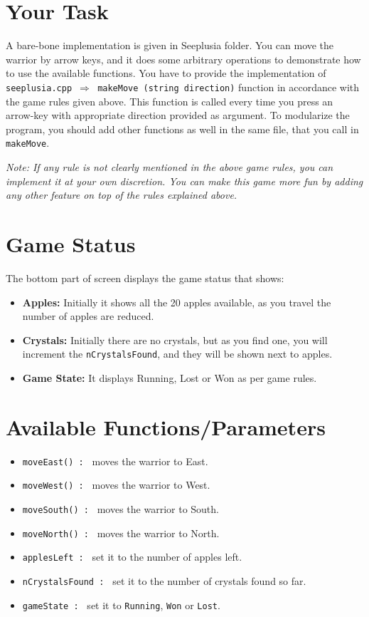 \documentclass[a4paper,12pt]{article}
\begin{document}
\section{Your Task}
A bare-bone implementation is given in Seeplusia folder. You can move the warrior by arrow keys, and it does some arbitrary operations to demonstrate how to use the available functions. You have to provide the implementation of \texttt{seeplusia.cpp $\Rightarrow$ makeMove (string direction)} function in accordance with the game rules given above. This function is called every time you press an arrow-key with appropriate direction provided as argument. To modularize the program, you should add other functions as well in the same file, that you call in \texttt{makeMove}.

\textit{ Note: If any rule is not clearly mentioned in the above game rules, you can implement it at your own discretion. You can make this game more fun by adding any other feature on top of the rules explained above. }

\section{Game Status}
The bottom part of screen displays the game status that shows:

\begin{itemize}
	\item \textbf{Apples: } Initially it shows all the 20 apples available, as you travel the number of apples are reduced.
	\item \textbf{Crystals: } Initially there are no crystals, but as you find one, you will increment the \texttt{nCrystalsFound}, and they will be shown next to apples.
	\item \textbf{Game State: } It displays Running, Lost or Won as per game rules.
\end{itemize}

\section{Available Functions/Parameters}

\begin{itemize}
	\item \texttt{moveEast() : } moves the warrior to East.
	\item \texttt{moveWest() : } moves the warrior to West.
	\item \texttt{moveSouth() : } moves the warrior to South.
	\item \texttt{moveNorth() : } moves the warrior to North.
	\item \texttt{applesLeft : } set it to the number of apples left.
	\item \texttt{nCrystalsFound : } set it to the number of crystals found so far.
	\item \texttt{gameState : } set it to \texttt{Running}, \texttt{Won} or \texttt{Lost}.
\end{itemize}
\end{document}

